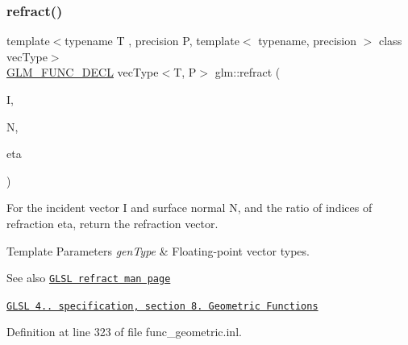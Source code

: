 \mbox{\label{group__core__func__geometric_ga99d8ddb244b129892babaca9778206d0}} 
\subsubsection{\texorpdfstring{refract()}{refract()}}
{\footnotesize\ttfamily template$<$typename T , precision P, template$<$ typename, precision $>$ class vec\+Type$>$ \\
\hyperlink{setup_8hpp_ab2d052de21a70539923e9bcbf6e83a51}{G\+L\+M\+\_\+\+F\+U\+N\+C\+\_\+\+D\+E\+CL} vec\+Type$<$T, P$>$ glm\+::refract (\begin{DoxyParamCaption}\item[{vec\+Type$<$ T, P $>$ const \&}]{I,  }\item[{vec\+Type$<$ T, P $>$ const \&}]{N,  }\item[{T const \&}]{eta }\end{DoxyParamCaption})}

For the incident vector I and surface normal N, and the ratio of indices of refraction eta, return the refraction vector.


\begin{DoxyTemplParams}{Template Parameters}
{\em gen\+Type} & Floating-\/point vector types.\\
\hline
\end{DoxyTemplParams}
\begin{DoxySeeAlso}{See also}
\href{http://www.opengl.org/sdk/docs/manglsl/xhtml/refract.xml}{\tt G\+L\+SL refract man page} 

\href{http://www.opengl.org/registry/doc/GLSLangSpec.4.20.8.pdf}{\tt G\+L\+SL 4.. specification, section 8. Geometric Functions} 
\end{DoxySeeAlso}


Definition at line 323 of file func\+\_\+geometric.\+inl.

